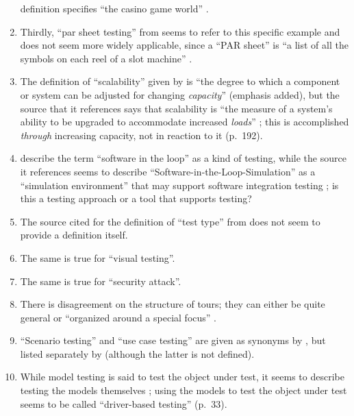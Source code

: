 \begin{enumerate}
            definition specifies ``the casino game world'' .
      \item Thirdly, ``par sheet testing'' from  seems to
            refer to this specific example and does not seem more widely
            applicable, since a ``PAR sheet'' is ``a list of all the symbols
            on each reel of a slot machine'' \citep{Bluejay2024}.
      \item The definition of ``scalability'' given by  is
            ``the degree to which a component or system can be adjusted for
            changing \emph{capacity}'' (emphasis added), but the source that it
            references says that scalability is ``the measure of a system's
            ability to be upgraded to accommodate increased \emph{loads}''
            \citep[p.~381,~emphasis added]{GerrardAndThompson2002}; this is
            accomplished \emph{through} increasing capacity, not in reaction to
            it (p.~192).
      \item {} describe the term ``software in the loop'' as a
            kind of testing, while the source it references seems to describe
            ``Software-in-the-Loop-Simulation'' as a ``simulation environment''
            that may support software integration testing
            \citep[p.~153]{SPICE2022}; is this a testing approach or a tool
            that supports testing?
      \item The source cited for the definition of ``test type'' from
             does not seem to provide a definition itself.
      \item The same is true for ``visual testing''.
      \item The same is true for ``security attack''.
      \item There is disagreement on the structure of tours; they can either be
            quite general \citep[p.~34]{IEEE2022} or ``organized around a
            special focus'' .
      \item ``Scenario testing'' and ``use case testing'' are given as synonyms
            by , but listed separately by
            \citet[p.~22]{IEEE2022} (although the latter is not defined).
      \item While model testing is said to test the object under test,
            it seems to describe testing the models themselves
            \citet[p.~20]{Firesmith2015}; using the models to test the object
            under test seems to be called ``driver-based testing'' (p.~33).

\end{enumerate}
